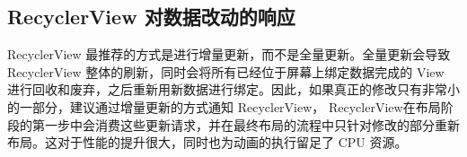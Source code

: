 


\subsection{RecyclerView 对数据改动的响应}

RecyclerView 最推荐的方式是进行增量更新，而不是全量更新。全量更新会导致 RecyclerView 整体的刷新，同时会将所有已经位于屏幕上绑定数据完成的 View 进行回收和废弃，之后重新用新数据进行绑定。因此，如果真正的修改只有非常小的一部分，建议通过增量更新的方式通知 RecyclerView， RecyclerView在布局阶段的第一步中会消费这些更新请求，并在最终布局的流程中只针对修改的部分重新布局。这对于性能的提升很大，同时也为动画的执行留足了 CPU 资源。

